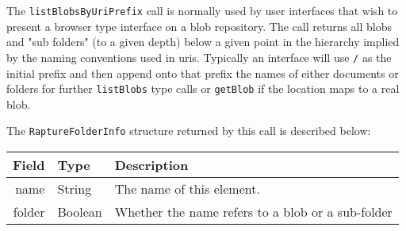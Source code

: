 The \verb+listBlobsByUriPrefix+ call is normally used by user interfaces that wish
to present a browser type interface on a blob repository. The call returns all blobs
and "sub folders" (to a given depth) below a given point in the hierarchy implied
by the naming conventions used in uris. Typically an interface will use \verb+/+ as
the initial prefix and then append onto that prefix the names of either documents
or folders for further \verb+listBlobs+ type calls or \verb+getBlob+ if the location
maps to a real blob.

The \verb+RaptureFolderInfo+ structure returned by this call is described below:

\begin{table}[H]
  \small
\begin{center}
\begin{tabular}{r l p{8cm}}
  Field & Type & Description \\
  \hline
  name & String & The name of this element. \\
  folder & Boolean & Whether the name refers to a blob or a sub-folder \\
\end{tabular}
\end{center}
\end{table}
